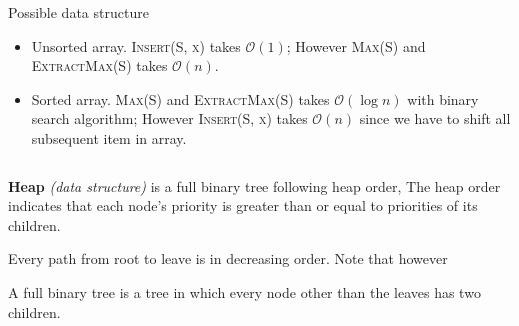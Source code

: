 \documentclass[11pt]{article}
\begin{document}
$ $\\
Possible data structure
\begin{itemize}
  \item Unsorted array. \textsc{Insert(S, x)} takes $\mathcal{O}(1)$; However \textsc{Max(S)} and \textsc{ExtractMax(S)} takes  $\mathcal{O}(n)$.
  \item Sorted array. \textsc{Max(S)} and \textsc{ExtractMax(S)} takes $\mathcal{O}(\log n)$ with binary search algorithm; However \textsc{Insert(S, x)} takes $\mathcal{O}(n)$ since we have to shift all subsequent item in array.
\end{itemize}

$ $\\
\begin{defn*}
  \textbf{Heap} \textit{(data structure)}
  is a full binary tree following heap order, The heap order indicates that each node's priority is greater than or equal to priorities of its children.
  \begin{rem}
    Every path from root to leave is in decreasing order. Note that however
  \end{rem}

\end{defn*}


\begin{defn*}
  A full binary tree is a tree in which every node other than the leaves has two children.
\end{defn*}
\end{document}
